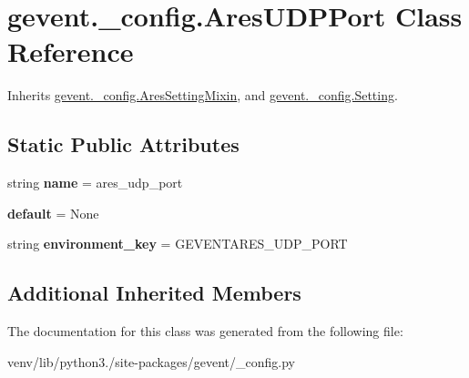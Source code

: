 \hypertarget{classgevent_1_1__config_1_1_ares_u_d_p_port}{}\section{gevent.\+\_\+config.\+Ares\+U\+D\+P\+Port Class Reference}
\label{classgevent_1_1__config_1_1_ares_u_d_p_port}


Inherits \hyperlink{classgevent_1_1__config_1_1_ares_setting_mixin}{gevent.\+\_\+config.\+Ares\+Setting\+Mixin}, and \hyperlink{classgevent_1_1__config_1_1_setting}{gevent.\+\_\+config.\+Setting}.

\subsection*{Static Public Attributes}
\begin{DoxyCompactItemize}
\item 
\mbox{\label{classgevent_1_1__config_1_1_ares_u_d_p_port_a68e5ecc07efa22eb50d30454f9fb7424}} 
string {\bfseries name} = \textquotesingle{}ares\+\_\+udp\+\_\+port\textquotesingle{}
\item 
\mbox{\label{classgevent_1_1__config_1_1_ares_u_d_p_port_a98f302bb5b6fe139b281e69b71d19644}} 
{\bfseries default} = None
\item 
\mbox{\label{classgevent_1_1__config_1_1_ares_u_d_p_port_a7898464cb41ab01da975b366b24c04ea}} 
string {\bfseries environment\+\_\+key} = \textquotesingle{}G\+E\+V\+E\+N\+T\+A\+R\+E\+S\+\_\+\+U\+D\+P\+\_\+\+P\+O\+RT\textquotesingle{}
\end{DoxyCompactItemize}
\subsection*{Additional Inherited Members}


The documentation for this class was generated from the following file\+:\begin{DoxyCompactItemize}
\item 
venv/lib/python3./site-\/packages/gevent/\+\_\+config.\+py\end{DoxyCompactItemize}
